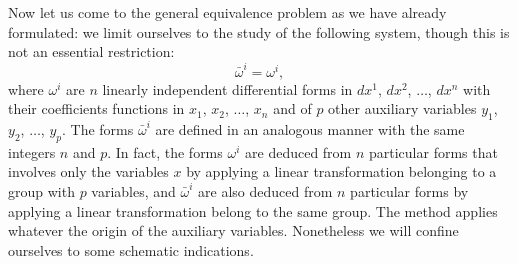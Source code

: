 \documentclass[leqno,11pt]{article}
\theoremstyle{shape1}
\theoremstyle{shape0}
\theoremstyle{shape2}
\theoremstyle{definition}
\begin{document}
\section{}
\label{sec:3}
Now let us come to the general equivalence problem as we have already formulated: we limit ourselves to the study of the following system, though this is not an essential restriction:
\begin{equation}
  \label{eq:3.I}\tag{I}
  \bar\omega^{i}=\omega^{i},
\end{equation}
where $\omega^{i}$ are $n$ linearly independent differential forms in $dx^{1}$, $dx^{2}$, $\dots$, $dx^{n}$ with their coefficients functions in $x_{1}$, $x_{2}$, $\dots$, $x_{n}$ and of $p$ other auxiliary variables $y_{1}$, $y_{2}$, $\dots$, $y_{p}$. The forms $\bar\omega^{i}$ are defined in an analogous manner with the same integers $n$ and $p$. In fact, the forms $\omega^{i}$ are deduced from $n$ particular forms that involves only the variables $x$ by applying a linear transformation belonging to a group with $p$ variables, and $\bar\omega^{i}$ are also deduced from $n$ particular forms by applying a linear transformation belong to the same group. The method applies whatever the origin of the auxiliary variables. Nonetheless we will confine ourselves to some schematic indications.
\end{document}
